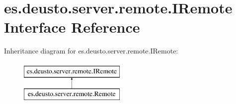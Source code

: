 \hypertarget{interfacees_1_1deusto_1_1server_1_1remote_1_1_i_remote}{}\section{es.\+deusto.\+server.\+remote.\+I\+Remote Interface Reference}
\label{interfacees_1_1deusto_1_1server_1_1remote_1_1_i_remote}
Inheritance diagram for es.\+deusto.\+server.\+remote.\+I\+Remote\+:\begin{figure}[H]
\begin{center}
\leavevmode
\includegraphics[height=2.000000cm]{interfacees_1_1deusto_1_1server_1_1remote_1_1_i_remote}
\end{center}
\end{figure}
